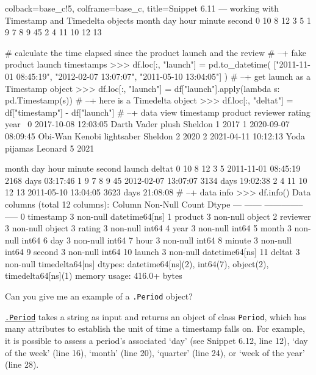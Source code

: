 \documentclass[a4paper,11pt]{book}
\newcommand{\question}[1]{%
    \begin{tcolorbox}[colback=comp_c!10,colframe=comp_c,sidebyside align=top,width=\linewidth,before skip=1ex]
        #1
    \end{tcolorbox}
    \switchcolumn%
}
\newcommand{\note}[1]{%
    \begin{tcolorbox}[colback=white!0,colframe=white!10,width=\linewidth,before skip=1ex]
        #1
    \end{tcolorbox}
}
\begin{document}
\begin{pythoncode}[linenos=True]{colback=base_c!5, colframe=base_c, title=\sffamily Snippet 6.11 --- working with Timestamp and Timedelta objects}
   month  day  hour  minute  second  
0     10    8    12       3       5  
1      9    7     8       9      45  
2      4   11    10      12      13 

# calculate the time elapsed since the product launch and the review
# --+ fake product launch timestamps 
>>> df.loc[:, "launch"] = pd.to_datetime(
	["2011-11-01 08:45:19", "2012-02-07 13:07:07", "2011-05-10 13:04:05"]
	)
# --+ get launch as a Timestamp object
>>> df.loc[:, "launch"] = df["launch"].apply(lambda s: pd.Timestamp(s))
# --+ here is a Timedelta object
>>> df.loc[:, "deltat"] = df["timestamp"] - df["launch"]
# --+ data view 
            timestamp                    product reviewer  rating  year  \
0 2017-10-08 12:03:05          Darth Vader plush  Sheldon       1  2017   
1 2020-09-07 08:09:45  Obi-Wan Kenobi lightsaber  Sheldon       2  2020   
2 2021-04-11 10:12:13               Yoda pijamas  Leonard       5  2021   

   month  day  hour  minute  second              launch             deltat  
0     10    8    12       3       5 2011-11-01 08:45:19 2168 days 03:17:46  
1      9    7     8       9      45 2012-02-07 13:07:07 3134 days 19:02:38  
2      4   11    10      12      13 2011-05-10 13:04:05 3623 days 21:08:08 
# --+ data info 
>>> df.info()
Data columns (total 12 columns):
     Column     Non-Null Count  Dtype          
---  ------     --------------  -----          
 0   timestamp  3 non-null      datetime64[ns] 
 1   product    3 non-null      object         
 2   reviewer   3 non-null      object         
 3   rating     3 non-null      int64          
 4   year       3 non-null      int64          
 5   month      3 non-null      int64          
 6   day        3 non-null      int64          
 7   hour       3 non-null      int64          
 8   minute     3 non-null      int64          
 9   second     3 non-null      int64          
 10  launch     3 non-null      datetime64[ns] 
 11  deltat     3 non-null      timedelta64[ns]
dtypes: datetime64[ns](2), int64(7), object(2), timedelta64[ns](1)
memory usage: 416.0+ bytes

\end{pythoncode}
\clearpage

\begin{paracol}{2}
	\question{Can you give me an example of a \texttt{.Period} object?}
	\note{\href{https://pandas.pydata.org/docs/reference/api/pandas.Period.html}{\texttt{.Period}} takes a string as input and returns an object of class \texttt{Period}, which has many attributes to establish the unit of time a timestamp falls on. For example, it is possible to assess a period's associated `day' (see Snippet 6.12, line 12), `day of the week' (line 16), `month' (line 20), `quarter' (line 24), or `week of the year' (line 28).
	}
\end{paracol}
\end{document}
